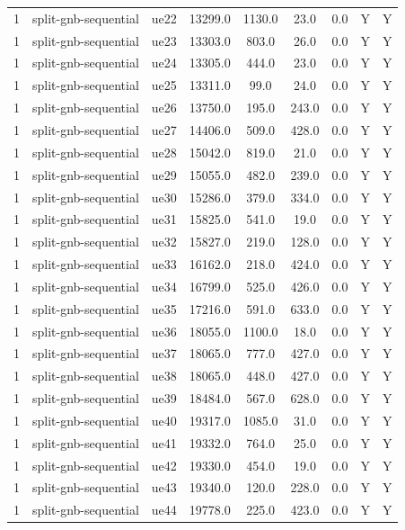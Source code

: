 \begin{table}[ht]
\begin{tabular}{|c|c|c|c|c|c|c|c|c|}
1 & split-gnb-sequential & ue22 & 13299.0 & 1130.0 & 23.0 & 0.0 & Y & Y \\
1 & split-gnb-sequential & ue23 & 13303.0 & 803.0 & 26.0 & 0.0 & Y & Y \\
1 & split-gnb-sequential & ue24 & 13305.0 & 444.0 & 23.0 & 0.0 & Y & Y \\
1 & split-gnb-sequential & ue25 & 13311.0 & 99.0 & 24.0 & 0.0 & Y & Y \\
1 & split-gnb-sequential & ue26 & 13750.0 & 195.0 & 243.0 & 0.0 & Y & Y \\
1 & split-gnb-sequential & ue27 & 14406.0 & 509.0 & 428.0 & 0.0 & Y & Y \\
1 & split-gnb-sequential & ue28 & 15042.0 & 819.0 & 21.0 & 0.0 & Y & Y \\
1 & split-gnb-sequential & ue29 & 15055.0 & 482.0 & 239.0 & 0.0 & Y & Y \\
1 & split-gnb-sequential & ue30 & 15286.0 & 379.0 & 334.0 & 0.0 & Y & Y \\
1 & split-gnb-sequential & ue31 & 15825.0 & 541.0 & 19.0 & 0.0 & Y & Y \\
1 & split-gnb-sequential & ue32 & 15827.0 & 219.0 & 128.0 & 0.0 & Y & Y \\
1 & split-gnb-sequential & ue33 & 16162.0 & 218.0 & 424.0 & 0.0 & Y & Y \\
1 & split-gnb-sequential & ue34 & 16799.0 & 525.0 & 426.0 & 0.0 & Y & Y \\
1 & split-gnb-sequential & ue35 & 17216.0 & 591.0 & 633.0 & 0.0 & Y & Y \\
1 & split-gnb-sequential & ue36 & 18055.0 & 1100.0 & 18.0 & 0.0 & Y & Y \\
1 & split-gnb-sequential & ue37 & 18065.0 & 777.0 & 427.0 & 0.0 & Y & Y \\
1 & split-gnb-sequential & ue38 & 18065.0 & 448.0 & 427.0 & 0.0 & Y & Y \\
1 & split-gnb-sequential & ue39 & 18484.0 & 567.0 & 628.0 & 0.0 & Y & Y \\
1 & split-gnb-sequential & ue40 & 19317.0 & 1085.0 & 31.0 & 0.0 & Y & Y \\
1 & split-gnb-sequential & ue41 & 19332.0 & 764.0 & 25.0 & 0.0 & Y & Y \\
1 & split-gnb-sequential & ue42 & 19330.0 & 454.0 & 19.0 & 0.0 & Y & Y \\
1 & split-gnb-sequential & ue43 & 19340.0 & 120.0 & 228.0 & 0.0 & Y & Y \\
1 & split-gnb-sequential & ue44 & 19778.0 & 225.0 & 423.0 & 0.0 & Y & Y \\

\end{tabular}
\end{table}
